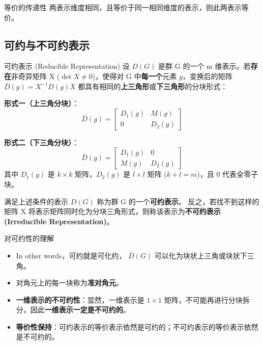 \begin{property}{等价的传递性}
    两表示维度相同，且等价于同一相同维度的表示，则此两表示等价。
\end{property}



\subsection{可约与不可约表示}
\begin{definition}{可约表示 (Reducible Representation)}
    设 $D(G)$ 是群 G 的一个 m 维表示。若\textbf{存在}非奇异矩阵 X ($\det X \neq 0$)，使得对 G 中\textbf{每一个}元素 $g$，变换后的矩阵 $\bar{D}(g) = X^{-1}D(g)X$ 都具有相同的\textbf{上三角形}或\textbf{下三角形}的分块形式：
    
    \textbf{形式一（上三角分块）}：
    \begin{equation}
        \bar{D}(g) = \begin{bmatrix} D_1(g) & M(g) \\ 0 & D_2(g) \end{bmatrix}
    \end{equation}
    
    \textbf{形式二（下三角分块）}：
    \begin{equation}
        \bar{D}(g) = \begin{bmatrix} D_1(g) & 0 \\ M(g) & D_2(g) \end{bmatrix}
    \end{equation}
    其中 $D_1(g)$ 是 $k \times k$ 矩阵，$D_2(g)$ 是 $l \times l$ 矩阵 ($k+l=m$)，且 $0$ 代表全零子块。
    
    满足上述条件的表示 $D(G)$ 称为群 G 的一个\textbf{可约表示}。
    反之，若找不到这样的矩阵 X 将表示矩阵同时化为分块三角形式，则称该表示为\textbf{不可约表示 (Irreducible Representation)}。
\end{definition}

\begin{note}{对可约性的理解}
    \begin{itemize}
        \item In other words，可约就是可化约， $\bar{D}(G)$ 可以化为块状上三角或块状下三角。
        \item 对角元上的每一块称为\textbf{准对角元}。
        \item \textbf{一维表示的不可约性}：显然，一维表示是 $1 \times 1$ 矩阵，不可能再进行分块拆分，因此\textbf{一维表示一定是不可约的}。
        \item \textbf{等价性保持}：可约表示的等价表示依然是可约的；不可约表示的等价表示依然是不可约的。
    \end{itemize}
\end{note}


